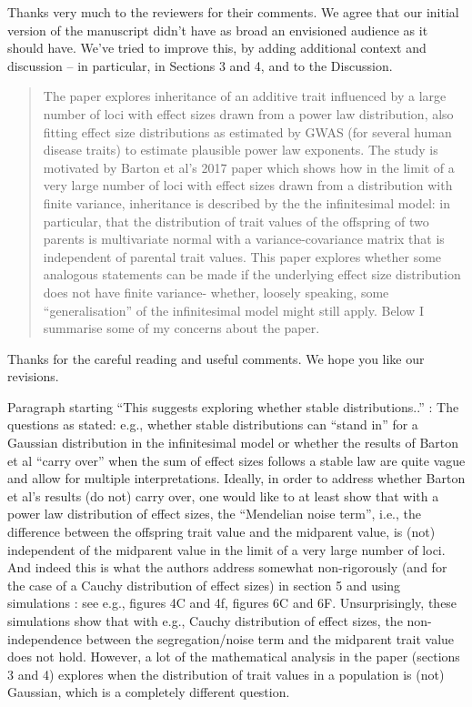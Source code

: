 Thanks very much to the reviewers for their comments.
We agree that our initial version of the manuscript didn't have as broad an envisioned audience
as it should have.
We've tried to improve this, by adding additional context and discussion --
in particular, in Sections 3 and 4, and to the Discussion.



\begin{quote}
The paper explores inheritance of an additive trait influenced by a large number of loci with effect sizes drawn from a power law distribution, also fitting effect size distributions as estimated by GWAS (for several human disease traits) to estimate plausible power law exponents. The study is motivated by Barton et al's 2017 paper which shows how in the limit of a very large number of loci with effect sizes drawn from a distribution with finite variance, inheritance is described by the the infinitesimal model: in particular, that the distribution of trait values of the offspring of two parents is multivariate normal with a variance-covariance matrix that is independent of parental trait values. This paper explores whether some analogous statements can be made if the underlying effect size distribution does not have finite variance- whether, loosely speaking, some ``generalisation'' of the infinitesimal model might still apply. Below I summarise some of my concerns about the paper.
\end{quote}

Thanks for the careful reading and useful comments.
We hope you like our revisions.

\begin{point}{}
    Paragraph starting ``This suggests exploring whether stable distributions..'' \revref:
The questions as stated: e.g., whether stable distributions can ``stand in'' for a Gaussian distribution in the infinitesimal model or whether the results of Barton et al ``carry over'' when the sum of effect sizes follows a stable law are quite vague and allow for multiple interpretations. Ideally, in order to address whether Barton et al's results (do not) carry over, one would like to at least show that with a power law distribution of effect sizes, the ``Mendelian noise term'', i.e., the difference between the offspring trait value and the midparent value, is (not) independent of the midparent value in the limit of a very large number of loci. And indeed this is what the authors address
somewhat non-rigorously (and for the case of a Cauchy distribution of effect sizes) in section 5 and using simulations : see e.g., figures 4C and 4f, figures 6C and 6F. Unsurprisingly, these simulations show that with e.g., Cauchy distribution of effect sizes, the non-independence between the segregation/noise term and the midparent trait value does not hold. However, a lot of the mathematical analysis in the paper (sections 3 and 4) explores when the distribution of trait values in a population is (not) Gaussian, which is a completely different question.
\end{point}

